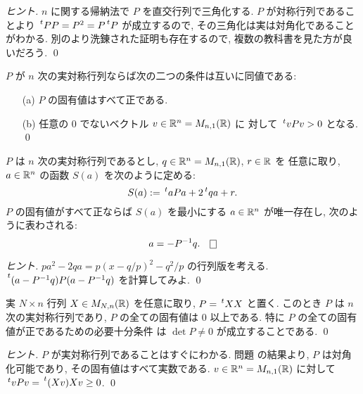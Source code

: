 \documentclass[12pt,twoside]{jarticle}
\begin{document}
\begin{proof}[ヒント]
  $n$ に関する帰納法で $P$ を直交行列で三角化する.
  $P$ が対称行列であることより $\tp{P}P=P^2=P\tp{P}$ が成立するので,
  その三角化は実は対角化であることがわかる.
  別のより洗錬された証明も存在するので,
  複数の教科書を見た方が良いだろう.
  \qed
\end{proof}

\begin{question}[5点]
  $P$ が $n$ 次の実対称行列ならば次の二つの条件は互いに同値である:
  \begin{itemize}
  \item[(a)] $P$ の固有値はすべて正である.
  \item[(b)] 任意の $0$ でないベクトル $v\in{\mathbb R}^n=M_{n,1}({\mathbb R})$ に
    対して $\tp{v}Pv > 0$ となる. \qed
  \end{itemize}
\end{question}

\begin{question}[5点]
  $P$ は $n$ 次の実対称行列であるとし, $q\in{\mathbb R}^n=M_{n,1}({\mathbb R})$, $r\in{\mathbb R}$ を
  任意に取り, $a\in{\mathbb R}^n$ の函数 $S(a)$ を次のように定める:
  \begin{equation*}
    S(a) := \tp{a}Pa + 2\tp{q}a + r.
  \end{equation*}
  $P$ の固有値がすべて正ならば $S(a)$ を最小にする $a\in{\mathbb R}^n$ 
  が唯一存在し, 次のように表わされる:
  \begin{equation*}
    a = - P^{-1}q.
    \qed
  \end{equation*}
\end{question}

\begin{proof}[ヒント]
  $pa^2-2qa = p(x-q/p)^2 - q^2/p$ の行列版を考える.
  $\tp{(a-P^{-1}q)}P(a-P^{-1}q)$ を計算してみよ.
  \qed
\end{proof}

\begin{question}[5点]
  実 $N\times n$ 行列 $X\in M_{N,n}({\mathbb R})$ を任意に取り, $P=\tp{X}X$ と置く.
  このとき $P$ は $n$ 次の実対称行列であり, 
  $P$ の全ての固有値は $0$ 以上である.
  特に $P$ の全ての固有値が正であるための必要十分条件
  は $\det P\ne 0$ が成立することである.
  \qed
\end{question}

\begin{proof}[ヒント]
  $P$ が実対称行列であることはすぐにわかる.
  問題  の結果より, 
  $P$ は対角化可能であり, その固有値はすべて実数である.
  $v\in{\mathbb R}^n=M_{n,1}({\mathbb R})$ に対して $\tp{v}Pv=\tp{(Xv)}Xv\ge 0$.
  \qed
\end{proof}
\end{document}
